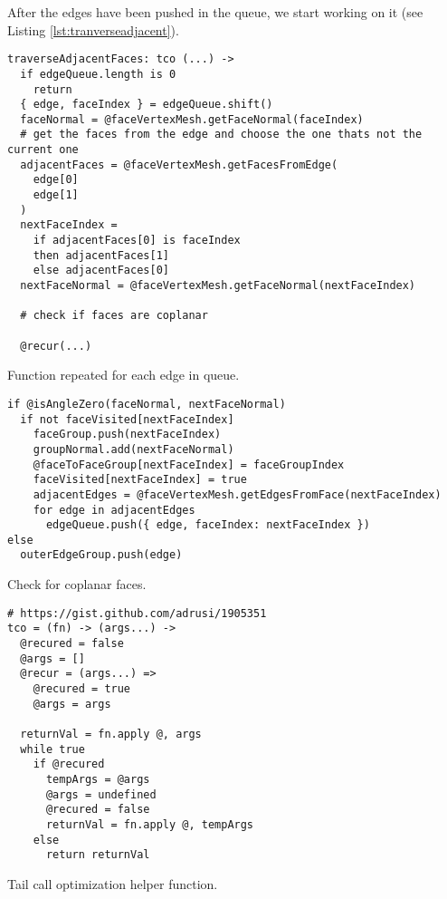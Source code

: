 \documentclass[../ClassicThesis.tex]{subfiles}
\begin{document}
After the edges have been pushed in the queue, we start working on it (see Listing \ref{lst:tranverseadjacent}).  

\begin{listing}[ht]
\begin{verbatim}
traverseAdjacentFaces: tco (...) ->
  if edgeQueue.length is 0
    return
  { edge, faceIndex } = edgeQueue.shift()
  faceNormal = @faceVertexMesh.getFaceNormal(faceIndex)
  # get the faces from the edge and choose the one thats not the current one
  adjacentFaces = @faceVertexMesh.getFacesFromEdge(
    edge[0]
    edge[1]
  )
  nextFaceIndex =
    if adjacentFaces[0] is faceIndex
    then adjacentFaces[1]
    else adjacentFaces[0]
  nextFaceNormal = @faceVertexMesh.getFaceNormal(nextFaceIndex)
 
  # check if faces are coplanar

  @recur(...)
\end{verbatim}
\caption{Function repeated for each edge in queue.}
\label{lst:traverseadjacent}
\end{listing}



\begin{listing}[ht]
\begin{verbatim}
if @isAngleZero(faceNormal, nextFaceNormal)
  if not faceVisited[nextFaceIndex]
    faceGroup.push(nextFaceIndex)
    groupNormal.add(nextFaceNormal)
    @faceToFaceGroup[nextFaceIndex] = faceGroupIndex
    faceVisited[nextFaceIndex] = true
    adjacentEdges = @faceVertexMesh.getEdgesFromFace(nextFaceIndex)
    for edge in adjacentEdges
      edgeQueue.push({ edge, faceIndex: nextFaceIndex })
else
  outerEdgeGroup.push(edge)
\end{verbatim}
\caption{Check for coplanar faces.}
\label{lst:coplanarcheck}
\end{listing}

\begin{listing}[ht]
\begin{verbatim}
# https://gist.github.com/adrusi/1905351
tco = (fn) -> (args...) ->
  @recured = false
  @args = []
  @recur = (args...) =>
    @recured = true
    @args = args

  returnVal = fn.apply @, args
  while true
    if @recured
      tempArgs = @args
      @args = undefined
      @recured = false
      returnVal = fn.apply @, tempArgs
    else
      return returnVal
\end{verbatim}
\caption{Tail call optimization helper function.}
\label{lst:tco}
\end{listing}
\end{document}

